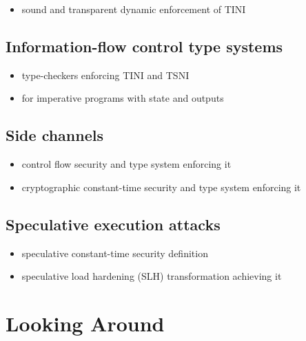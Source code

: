 \documentclass[12pt]{report}
\begin{document}
\begin{itemize}
\item  sound and transparent dynamic enforcement of TINI 
\end{itemize}


\subsection{Information-flow control type systems}



\begin{itemize}
\item  type-checkers enforcing TINI and TSNI

\item  for imperative programs with state and outputs 
\end{itemize}


\subsection{Side channels}



\begin{itemize}
\item  control flow security and type system enforcing it

\item  cryptographic constant-time security and type system enforcing it 
\end{itemize}


\subsection{Speculative execution attacks}



\begin{itemize}
\item  speculative constant-time security definition

\item  speculative load hardening (SLH) transformation achieving it 

\end{itemize}
\begin{coqdoccode}
\coqdocemptyline
\end{coqdoccode}
\section{Looking Around}
\end{document}
